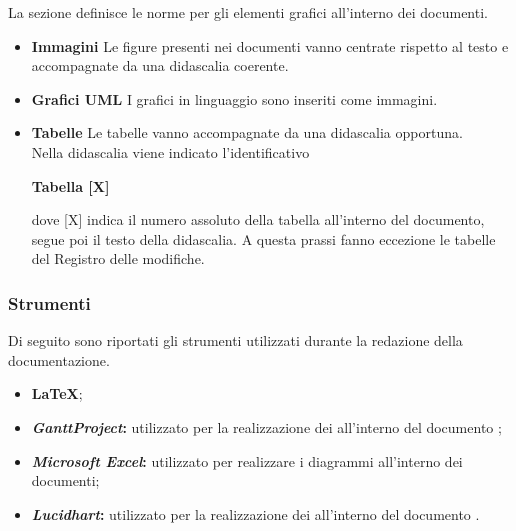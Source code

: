 La sezione definisce le norme per gli elementi grafici all'interno dei documenti.
\begin{itemize}
\item\textbf{Immagini}
Le figure presenti nei documenti vanno centrate rispetto al testo e accompagnate da una didascalia coerente.
\item\textbf{Grafici UML}
I grafici in linguaggio  sono inseriti come immagini.
\item\textbf{Tabelle}
Le tabelle vanno accompagnate da una didascalia opportuna.\\
Nella didascalia viene indicato l'identificativo 
\begin{center}
	\textbf{Tabella [X]} 
\end{center}
dove [X] indica il numero assoluto della tabella all'interno del documento, segue poi il testo della didascalia.
A questa prassi fanno eccezione le tabelle del Registro delle modifiche.
\end{itemize}

\subsubsection{Strumenti} \label{Documentazione_Strumenti}
Di seguito sono riportati gli strumenti utilizzati durante la redazione della documentazione.
\begin{itemize}
	\item \textbf{\LaTeX};
	\item \textbf{\textit{GanttProject}:} utilizzato per la realizzazione dei  all'interno del documento ;
	\item \textbf{\textit{Microsoft Excel}:} utilizzato per realizzare i diagrammi all'interno dei documenti;
	\item \textbf{\textit{Lucidhart}:} utilizzato per la realizzazione dei  all'interno del documento .
\end{itemize}

